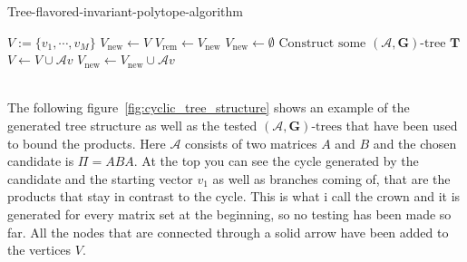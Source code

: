 \vspace{1cm}

\begin{algorithm}
  \caption{Tree-flavored-invariant-polytope-algorithm}
  \label{alg:hybrid}
  \begin{algorithmic}
      \State $V := \{v_1, \cdots, v_M\}$
      \State $V_{\text{new}} \gets V$
          \State $V_{\text{rem}} \gets V_{\text{new}}$
          \State $V_{\text{new}} \gets \emptyset$
              \State $\text{Construct some } (\mathcal{A},\mathbf{G})\text{-tree } \mathbf{T}$
                  \State $V \gets V \cup \mathcal{A}v$
                  \State $V_{\text{new}} \gets V_{\text{new}} \cup \mathcal{A}v$
              \EndIf  
          \EndFor
      \EndWhile \\
      \Return \\
  \end{algorithmic}
\end{algorithm}

\vspace{1cm}

The following figure~\ref{fig:cyclic_tree_structure} shows an example of the generated tree structure as well as the tested $(\mathcal{A},\mathbf{G})\text{-trees}$ that have been used to bound the products. Here $\mathcal{A}$ consists of two matrices $A$ and $B$ and the chosen candidate is $ \Pi = ABA$. At the top you can see the cycle generated by the candidate and the starting vector $v_1$ as well as branches coming of, that are the products that stay in contrast to the cycle. This is what i call the crown and it is generated for every matrix set at the beginning, so no testing has been made so far. All the nodes that are connected through a solid arrow have been added to the vertices $V$.

